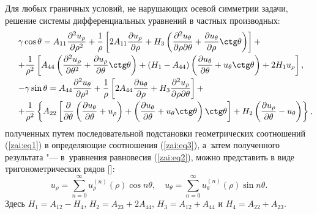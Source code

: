 Для любых граничных условий, не нарушающих осевой симметрии задачи,
решение системы дифференциальных уравнений в частных производных:
\begin{equation}
\label{zai:eq5}
\begin{array}{l}
\displaystyle
 \gamma \cos \theta = A_{11} \frac{\partial ^2u_\rho }{\partial \rho^2} +
\frac{1}{\rho}\left[ {2A_{11} \frac{\partial u_\rho }{\partial \rho
} + H_{3} \left( {\frac{\partial ^2u_\theta }{\partial \rho
\partial \theta } +
\frac{\partial u_\theta }{\partial \rho } \ctg\theta } \right)} \right] + \vspace{1mm} \\
\displaystyle
 + \frac{1}{\rho ^2}\left[ {A_{44} \left( {\frac{\partial ^2u_\rho
}{\partial \theta ^2} + \frac{\partial u_\rho }{\partial \theta
}\ctg\theta } \right) + \left( {H_{1} - A_{44} } \right)\left(
{\frac{\partial u_\theta }{\partial \theta } + u_\theta \ctg\theta }
\right) + 2H_{1} u_\rho } \right], \vspace{1mm} \hspace{-5mm}
\\
\displaystyle
  - \gamma \sin \theta = A_{44} \frac{\partial ^2u_\theta }{\partial \rho ^2}
+ \frac{1}{\rho }\left[ {2A_{44} \frac{\partial u_\theta }{\partial
\rho } +
H_3 \frac{\partial ^2u_\rho }{\partial \rho \partial \theta }} \right] + \vspace{1mm}  \\
\displaystyle
 + \frac{1}{\rho ^2}\left\{ {A_{22} \left[ {\frac{\partial }{\partial \theta
}\left( {\frac{\partial u_\theta }{\partial \theta } + u_\rho }
\right) + \left( {\frac{\partial u_\theta }{\partial \theta } +
u_\theta \ctg\theta } \right)\ctg\theta } \right] + H_2 \left(
{\frac{\partial u_\rho }{\partial \theta } - u_\theta } \right)}
\right\}, \hspace{-5mm}
\end{array}
\end{equation}
\noindent полученных путем последовательной подстановки
геометрических соотношений (\ref{zai:eq1}) в определяющие соотношения (\ref{zai:eq3}), а~затем полученного результата "--- в~уравнения равновесия (\ref{zai:eq2}),
можно представить в виде тригонометрических рядов
[]:
\begin{equation}
\label{zai:eq6} u_\rho = \sum\limits_{n = 0}^\infty {u^{\left( n
\right)}_{\rho} \left( \rho \right)} \cos n\theta , \quad u_\theta =
\sum\limits_{n = 0}^\infty {u^{(n)}_{\theta} \left(
\rho \right)} \sin n\theta .
\end{equation}
\noindent Здесь $H_{1} = A_{12} - H_{4}$, $H_{2} = A_{23} +
2A_{44}$, $H_{3} = A_{12} + A_{44}$ и $H_{4} =A_{22} + A_{23}$.

